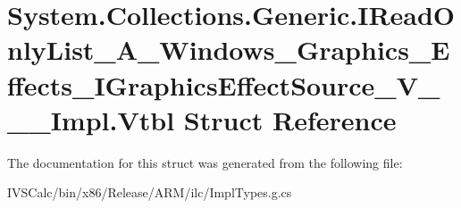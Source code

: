 \hypertarget{struct_system_1_1_collections_1_1_generic_1_1_i_read_only_list___a___windows___graphics___effect7ce121688f0d32ed7b06ff5ad3dd6a1b}{}\section{System.\+Collections.\+Generic.\+I\+Read\+Only\+List\+\_\+\+A\+\_\+\+Windows\+\_\+\+Graphics\+\_\+\+Effects\+\_\+\+I\+Graphics\+Effect\+Source\+\_\+\+V\+\_\+\+\_\+\+\_\+\+Impl.\+Vtbl Struct Reference}
\label{struct_system_1_1_collections_1_1_generic_1_1_i_read_only_list___a___windows___graphics___effect7ce121688f0d32ed7b06ff5ad3dd6a1b}


The documentation for this struct was generated from the following file\+:\begin{DoxyCompactItemize}
\item 
I\+V\+S\+Calc/bin/x86/\+Release/\+A\+R\+M/ilc/Impl\+Types.\+g.\+cs\end{DoxyCompactItemize}
